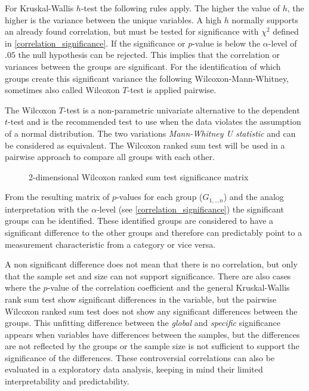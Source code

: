 \medskip

For Kruskal-Wallis $h$-test the following rules apply. The higher the value of $h$, the higher is the variance between the unique variables. A high $h$ normally supports an already found correlation, but must be tested for significance with $\chi^2$ defined in \cref{correlation_significance}. If the significance or $p$-value is below the $\alpha$-level of $.05$ the null hypothesis can be rejected. This implies that the correlation or variances between the groups are significant. For the identification of which groups create this significant variance the following Wilcoxon-Mann-Whitney, sometimes also called Wilcoxon $T$-test is applied pairwise.

The Wilcoxon $T$-test is a non-parametric univariate alternative to the dependent $t$-test and is the recommended test to use when the data violates the assumption of a normal distribution. The two variations \textit{Mann-Whitney U statistic} and  can be considered as equivalent. The Wilcoxon ranked sum test will be used in a pairwise approach to compare all groups with each other. 
\begin{figure}[ht]
	\centering
  	\caption{2-dimensional Wilcoxon ranked sum test significance matrix}
\end{figure}

From the resulting matrix of $p$-values for each group ($G_{1,...n}$) and the analog interpretation with the $\alpha$-level (see \cref{correlation_significance}) the significant groups can be identified. These identified groups are considered to have a significant difference to the other groups and therefore can predictably point to a measurement characteristic from a category or vice versa.

A non significant difference does not mean that there is no correlation, but only that the sample set and size can not support significance. There are also cases where the $p$-value of the correlation coefficient and the general Kruskal-Wallis rank sum test show significant differences in the variable, but the pairwise Wilcoxon ranked sum test does not show any significant differences between the groups. This unfitting difference between the \textit{global} and \textit{specific} significance appears when variables have differences between the samples, but the differences are not reflected by the groups or the sample size is not sufficient to support the significance of the differences. These controversial correlations can also be evaluated in a exploratory data analysis, keeping in mind their limited interpretability and predictability.

